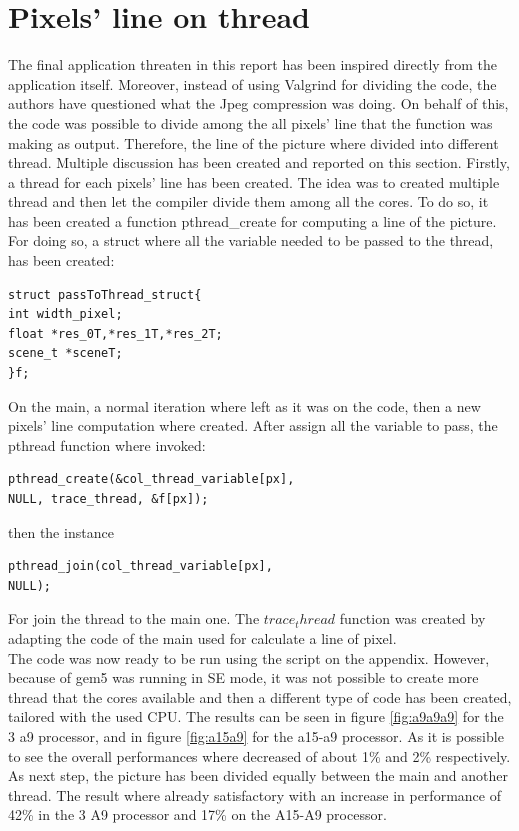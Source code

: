\documentclass[journal]{IEEEtran}
\begin{document}
\section{Pixels' line on thread}
The final application threaten in this report has been inspired directly from the application itself. Moreover, instead of using Valgrind for dividing the code, the authors have questioned what the Jpeg compression was doing. On behalf of this, the code was possible to divide among the all pixels’ line that the function was making as output. Therefore, the line of the picture where divided into different thread. Multiple discussion has been created and reported on this section.
Firstly, a thread for each pixels’ line has been created. The idea was to created multiple thread and then let the compiler divide them among all the cores. 
To do so, it has been created a function pthread\_create for computing a line of the picture.
For doing so, a struct where all the variable needed to be passed to the thread, has been created:
\begin{lstlisting}
struct passToThread_struct{
int width_pixel;
float *res_0T,*res_1T,*res_2T;
scene_t *sceneT;
}f;
\end{lstlisting}
On the main, a normal iteration where left as it was on the code, then a new pixels’ line computation where created. After assign all the variable to pass, the pthread function where invoked:
\begin{lstlisting}
pthread_create(&col_thread_variable[px],
NULL, trace_thread, &f[px]);
\end{lstlisting} 
then the instance 
\begin{lstlisting}
pthread_join(col_thread_variable[px], 
NULL);
\end{lstlisting}
For join the thread to the main one.
The \(trace_thread\) function was created by adapting the code of the main used for calculate a line of pixel.\\

The code was now ready to be run using the script on the appendix.
However, because of gem5 was running in SE mode, it was not possible to create more thread that the cores available and then a different type of code has been created, tailored with the used CPU.
The results can be seen in figure \ref{fig:a9a9a9} for the 3 a9 processor, and in figure \ref{fig:a15a9} for the a15-a9 processor. As it is possible to see the overall performances where decreased of about 1\% and 2\% respectively.
As next step, the picture has been divided equally between the main and another thread. The result where already satisfactory with an increase in performance of 42\% in the 3 A9 processor and 17\% on the A15-A9 processor.\\
\end{document}
